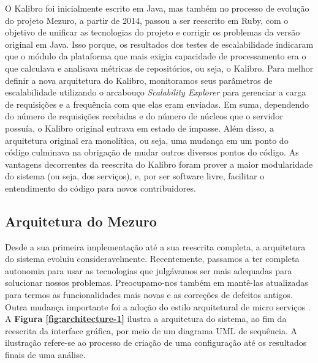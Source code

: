 \documentclass{llncs}
\begin{document}
O Kalibro\cite{de2013kalibro} foi inicialmente escrito em Java, mas também no
processo de evolução do projeto Mezuro, a partir de 2014, passou a ser
reescrito em Ruby, com o objetivo de unificar as tecnologias do projeto e
corrigir os problemas da versão original em Java.
%
Isso porque, os resultados dos testes de escalabilidade indicaram que o módulo
da plataforma que mais exigia capacidade de processamento era o que calculava e
analisava métricas de repositórios, ou seja, o Kalibro.
%
Para melhor definir a nova arquitetura do Kalibro, monitoramos seus parâmetros
de escalabilidade utilizando o arcabouço \textit{Scalability Explorer}
\cite{moura2013automated} para gerenciar a carga de requisições e a frequência
com que elas eram enviadas. 
%
Em suma, dependendo do número de requisições recebidas e do número de núcleos
que o servidor possuía, o Kalibro original entrava em estado de impasse. Além
disso, a arquitetura original era monolítica, ou seja, uma mudança em um ponto
do código culminava na obrigação de mudar outros diversos pontos do código.
%
As vantagens decorrentes da reescrita do Kalibro foram prover a maior
modularidade do sistema (ou seja, dos serviços), e, por ser software livre,
facilitar o entendimento do código para novos contribuidores.


\subsection{Arquitetura do Mezuro}
\label{sec:arquitetura}

Desde a sua primeira implementação até a sua reescrita completa, a arquitetura
do sistema evoluiu consideravelmente.
%
Recentemente, passamos a ter completa autonomia para usar as tecnologias que
julgávamos ser mais adequadas para solucionar nossos problemas. Preocupamo-nos
também em mantê-las atualizadas para termos as funcionalidades mais novas e as
correções de defeitos antigos. Outra mudança importante foi a adoção do estilo
arquitetural de micro serviços \cite{namiot2014micro}.
%
A \textbf{Figura \ref{fig:architecture-1}} ilustra a arquitetura do sistema, ao
fim da reescrita da interface gráfica, por meio de um diagrama UML de
sequência. A ilustração refere-se ao processo de criação de uma configuração
até os resultados finais de uma análise.
\end{document}
